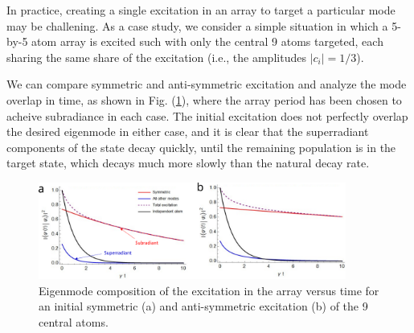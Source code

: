 In practice, creating a single excitation in an array to target a particular mode may be challening. As a case study, we consider a simple situation in which a 5-by-5 atom array is excited such with only the central 9 atoms targeted, each sharing the same share of the excitation (i.e., the amplitudes $|c_i|=1/3$).

We can compare symmetric and anti-symmetric excitation and analyze the mode overlap in time, as shown in Fig. (\ref{fig:collective_mode_decay_2d}), where the array period has been chosen to acheive subradiance in each case. The initial excitation does not perfectly overlap the desired eigenmode in either case, and it is clear that the superradiant components of the state decay quickly, until the remaining population is in the target state, which decays much more slowly than the natural decay rate.
\begin{figure}[!ht]
    \centering
    \includegraphics[width=0.9\textwidth]{Images/collective_decay_composition.pdf}
    \caption{Eigenmode composition of the excitation in the array versus time for an initial symmetric (a) and anti-symmetric excitation (b) of the 9 central atoms.}
    \label{fig:collective_mode_decay_2d}
\end{figure}

